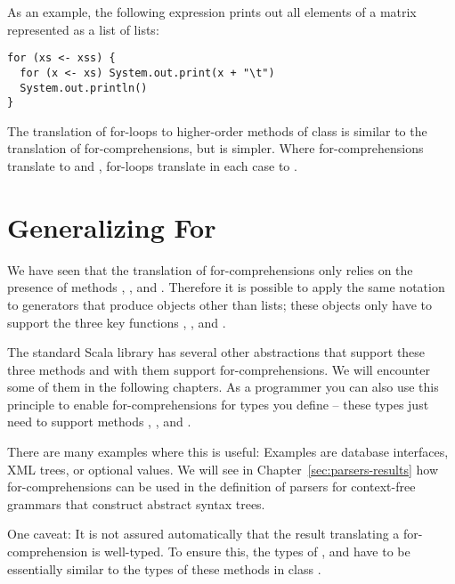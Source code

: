 {As an example, the following expression prints out all elements of a
matrix represented as a list of lists:
 \begin{lstlisting}
for (xs <- xss) {
  for (x <- xs) System.out.print(x + "\t")
  System.out.println()
}
\end{lstlisting}
The translation of for-loops to higher-order methods of class
 is similar to the translation of for-comprehensions, but
is simpler. Where for-comprehensions translate to  and
, for-loops translate in each case to .

\section{Generalizing For}

We have seen that the translation of for-comprehensions only relies on
the presence of methods , , and
. Therefore it is possible to apply the same notation to
generators that produce objects other than lists; these objects only
have to support the three key functions , ,
and .

The standard Scala library has several other abstractions that support
these three methods and with them support for-comprehensions. We will
encounter some of them in the following chapters. As a programmer you
can also use this principle to enable for-comprehensions for types you
define -- these types just need to support methods ,
, and .

There are many examples where this is useful: Examples are database
interfaces, XML trees, or optional values. We will see in
Chapter~\ref{sec:parsers-results} how for-comprehensions can be used
in the definition of parsers for context-free grammars that construct
abstract syntax trees.

One caveat: It is not assured automatically that the result
translating a for-comprehension is well-typed. To ensure this, the
types of ,  and  have to be
essentially similar to the types of these methods in class .

}
